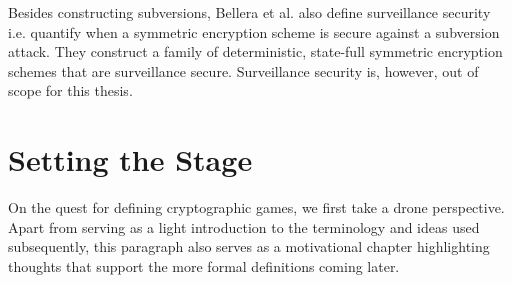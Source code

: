 Besides constructing subversions, Bellera et al. also define surveillance security i.e. quantify when a symmetric encryption scheme is secure against a subversion attack. They construct a family of deterministic, state-full symmetric encryption schemes that are surveillance secure.  Surveillance security is, however, out of scope for this thesis. 	


\section{Setting the Stage}

On the quest for defining cryptographic games, we first take a drone perspective. Apart from serving as a light introduction to the terminology and ideas used subsequently, this paragraph also serves as a motivational chapter highlighting thoughts that support the more formal definitions coming later. 


